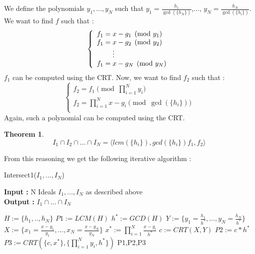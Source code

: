 \documentclass{article}
\newtheorem{theorem}{Theorem}[section]
\begin{document}
We define the polynomials $y_{1},\dots,y_{N}$ such that $y_{1} = \displaystyle \frac{h_{1}}{\gcd(\{h_{N}\})}$,$\dots$, $y_{N} = \displaystyle \frac{h_{N}}{\gcd(\{h_{i}\})}$. We want to find $f$ such that : 
\begin{displaymath}
    \left\{
    \begin{array}{ll}
        f_{1} = x-g_{1} \pmod {y_{1}} \\
        f_{1} = x-g_{2} \pmod {y_{2}} \\
        \hspace{8mm} \vdots \\
        f_{1} = x-g_{N} \pmod{y_{N}}\\
    \end{array}
    \right.
\end{displaymath}
$f_{1}$ can be computed using the CRT. Now, we want to find $f_{2}$ such that : 
\begin{displaymath}
    \left\{
    \begin{array}{ll}
        f_{2} = f_{1} \pmod {\prod_{i=1}^{N} y_{i}} \\
        f_{2} = \prod^{N}_{i=1} x-g_{i} \pmod {\gcd(\{h_{i}\})} \\
    \end{array}
    \right.
\end{displaymath}
Again, such a polynomial can be computed using the CRT. 

\begin{theorem}
    \begin{displaymath}
        I_{1} \cap I_{2} \cap \dots \cap I_{N} = \langle lcm(\{h_{i}\}), gcd(\{h_{i}\})f_{1},f_{2} \rangle
    \end{displaymath}
\end{theorem}

From this reasoning we get the following iterative algorithm : 

\begin{algorithm}
    \caption{Intersect1($I_{1},...,I_{N}$)}\label{alg:intersect-n-ideals-equal-gcd}
    \textbf{Input : } N Ideals $I_{1},...,I_{N}$ as described above \\
    \textbf{Output : }$I_{1} \cap ...\cap I_ {N}$
\begin{algorithmic}
    \State $H := \{h_{1},..,h_{N}\}$
    \State $P1 := LCM(H)$
    \State $h^{*} := GCD(H)$
    \State $Y:= \{y_{1}= \frac{h_{1}}{h^{*}},...,y_{N}= \frac{h_{N}}{h^{*}}\}$
    \State $X := \{x_{1} = \frac{x-g_{1}}{y_{1}},...,x_{N} =\frac{x-g_{N}}{y_{N}}\}$
    \State $x^{*} := \prod^{N}_{i=1} \frac{x-g_{i}}{h^{*}}$
    \State $c:= CRT(X,Y)$
    \State $P2 := c*h^{*}$
    \State $P3 := CRT(\{c,x^{*}\},\{\prod^{N}_{i=1} y_{i}, h^{*}\})$
    \State \Return P1,P2,P3
\end{algorithmic}
\end{algorithm}
\end{document}
